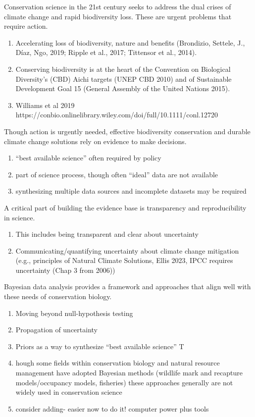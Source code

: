 \documentclass{article}
\begin{document}
\par Conservation science in the 21st century seeks to address the dual crises of  climate change and rapid biodiversity loss. These are urgent problems that require action.
\begin{enumerate}
\item Accelerating loss of biodiversity, nature and benefits (Brondizio, Settele, J., Díaz, Ngo, 2019; Ripple et al., 2017; Tittensor et al., 2014). 
\item Conserving biodiversity is at the heart of the Convention on Biological Diversity's (CBD) Aichi targets (UNEP CBD 2010) and of Sustainable Development Goal 15 (General Assembly of the United Nations 2015).
\item Williams et al 2019 https://conbio.onlinelibrary.wiley.com/doi/full/10.1111/conl.12720
\end{enumerate}
\par Though action is urgently needed, effective biodiversity conservation and durable climate change solutions rely on evidence to make decisions. 
\begin{enumerate}
\item “best available science” often required by  policy
\item part of science process, though often “ideal” data are not available
\item synthesizing multiple data sources  and incomplete datasets may be required 
\end{enumerate}


\par A critical part of building the evidence base is transparency and reproducibility in science. 
\begin{enumerate}
\item This includes being transparent and clear about uncertainty
\item Communicating/quantifying uncertainty about climate change mitigation (e.g., principles of Natural Climate Solutions, Ellis 2023, IPCC requires uncertainty (Chap 3 from 2006))

\end{enumerate}

\par Bayesian data analysis provides a framework and approaches that align well with these needs of conservation biology.
\begin{enumerate}

\item Moving beyond null-hypothesis testing 
\item Propagation of uncertainty
\item Priors as a way to synthesize “best available science”
T\item hough some fields within conservation biology and natural resource management have adopted Bayesian methods (wildlife mark and recapture models/occupancy models, fisheries) these approaches generally  are not widely used in conservation science
\item consider adding- easier now to do it! computer power plus tools
\end{enumerate}
\end{document}
